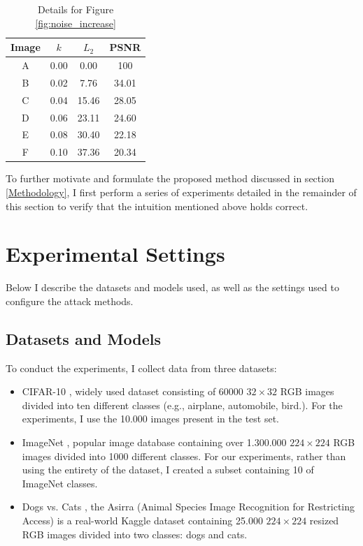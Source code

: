 \begin{table}[htb]
    \centering
    \begin{tabular}{c c c c}
        \toprule
        Image & $k$  & $L_{2}$ & PSNR  \\
        \midrule
        A     & 0.00 & 0.00    & 100   \\
        B     & 0.02 & 7.76    & 34.01 \\
        C     & 0.04 & 15.46   & 28.05 \\
        D     & 0.06 & 23.11   & 24.60 \\
        E     & 0.08 & 30.40   & 22.18 \\
        F     & 0.10 & 37.36   & 20.34 \\
        \bottomrule
    \end{tabular}
    \caption{Details for Figure \ref{fig:noise_increase}}
    \label{table:noise_increase}
\end{table}

To further motivate and formulate the proposed method discussed in section
\ref{Methodology}, I first perform a series of experiments detailed in the
remainder of this section to verify that the intuition mentioned above holds
correct.

\section{Experimental Settings}
Below I describe the datasets and models used, as well as the settings used to
configure the attack methods.

\subsection{Datasets and Models}
\label{sub:datasets_models}

To conduct the experiments, I collect data from three datasets:
\begin{itemize}
    \item CIFAR-10 \cite{krizhevsky_learning_2009}, widely used dataset
          consisting of 60000 $32 \times 32$ RGB images divided into ten
          different classes (e.g., airplane, automobile, bird.). For the
          experiments, I use the 10.000 images present in the test set.
    \item ImageNet \cite{russakovsky_imagenet_2015}, popular image database
          containing over 1.300.000 $224 \times 224$ RGB images divided into
          1000 different classes. For our experiments, rather than using the
          entirety of the dataset, I created a subset containing 10 of ImageNet
          classes.
    \item Dogs vs. Cats \cite{elson_asirra_2007}, the Asirra (Animal Species
          Image Recognition for Restricting Access) is a real-world Kaggle
          dataset containing 25.000 $224 \times 224$ resized RGB images divided
          into two classes: dogs and cats.
\end{itemize}

